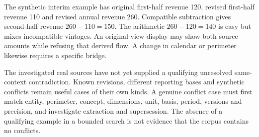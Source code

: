 The synthetic interim example has original first-half revenue 120, revised
first-half revenue 110 and revised annual revenue 260. Compatible subtraction
gives second-half revenue $260-110=150$. The arithmetic $260-120=140$ is easy
but mixes incompatible vintages. An original-view display may show both source
amounts while refusing that derived flow. A change in calendar or perimeter
likewise requires a specific bridge.

The investigated real sources have not yet supplied a qualifying unresolved
same-context contradiction. Known revisions, different reporting bases and
synthetic conflicts remain useful cases of their own kinds. A genuine conflict
case must first match entity, perimeter, concept, dimensions, unit, basis,
period, versions and precision, and investigate extraction and supersession.
The absence of a qualifying example in a bounded search is not evidence that
the corpus contains no conflicts.
